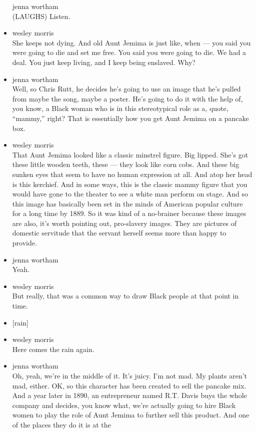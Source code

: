 \begin{itemize}
  jenna wortham\\
  (LAUGHS) Listen.
\item
  wesley morris\\
  She keeps not dying. And old Aunt Jemima is just like, when --- you
  said you were going to die and set me free. You said you were going to
  die. We had a deal. You just keep living, and I keep being enslaved.
  Why?
\item
  jenna wortham\\
  Well, so Chris Rutt, he decides he's going to use an image that he's
  pulled from maybe the song, maybe a poster. He's going to do it with
  the help of, you know, a Black woman who is in this stereotypical role
  as a, quote, ``mammy,'' right? That is essentially how you get Aunt
  Jemima on a pancake box.
\item
  wesley morris\\
  That Aunt Jemima looked like a classic minstrel figure. Big lipped.
  She's got these little wooden teeth, these --- they look like corn
  cobs. And these big sunken eyes that seem to have no human expression
  at all. And atop her head is this kerchief. And in some ways, this is
  the classic mammy figure that you would have gone to the theater to
  see a white man perform on stage. And so this image has basically been
  set in the minds of American popular culture for a long time by 1889.
  So it was kind of a no-brainer because these images are also, it's
  worth pointing out, pro-slavery images. They are pictures of domestic
  servitude that the servant herself seems more than happy to provide.
\item
  jenna wortham\\
  Yeah.
\item
  wesley morris\\
  But really, that was a common way to draw Black people at that point
  in time.
\item
  {[}rain{]}
\item
  wesley morris\\
  Here comes the rain again.
\item
  jenna wortham\\
  Oh, yeah, we're in the middle of it. It's juicy. I'm not mad. My
  plants aren't mad, either. OK, so this character has been created to
  sell the pancake mix. And a year later in 1890, an entrepreneur named
  R.T. Davis buys the whole company and decides, you know what, we're
  actually going to hire Black women to play the role of Aunt Jemima to
  further sell this product. And one of the places they do it is at the

\end{itemize}
